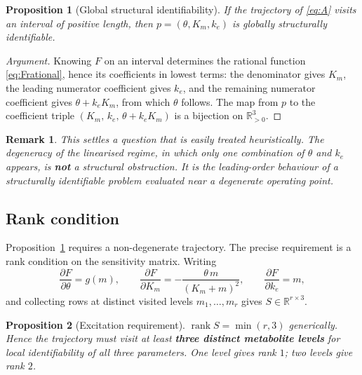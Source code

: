 \documentclass[11pt,a4paper]{article}
\newtheorem{proposition}{Proposition}
\newtheorem{remark}{Remark}
\newcommand{\R}{\mathbb{R}}
\begin{document}
\begin{proposition}[Global structural identifiability]
\label{prop:global}
If the trajectory of \eqref{eq:A} visits an interval of positive length, then
$p = (\theta, K_m, k_e)$ is globally structurally identifiable.
\end{proposition}

\begin{proof}[Argument]
Knowing $F$ on an interval determines the rational function \eqref{eq:Frational}, hence its
coefficients in lowest terms: the denominator gives $K_m$, the leading numerator
coefficient gives $k_e$, and the remaining numerator coefficient gives $\theta + k_e K_m$,
from which $\theta$ follows. The map from $p$ to the coefficient triple
$(K_m,\, k_e,\, \theta + k_e K_m)$ is a bijection on $\R_{>0}^3$.
\end{proof}

\begin{remark}
This settles a question that is easily treated heuristically. The degeneracy of the
linearised regime, in which only one combination of $\theta$ and $k_e$ appears, is
\textbf{not} a structural obstruction. It is the leading-order behaviour of a
structurally identifiable problem evaluated near a degenerate operating point.
\end{remark}

\subsection{Rank condition}

Proposition~\ref{prop:global} requires a non-degenerate trajectory. The precise
requirement is a rank condition on the sensitivity matrix. Writing
\begin{equation}
\frac{\partial F}{\partial \theta} = g(m), \qquad
\frac{\partial F}{\partial K_m} = -\frac{\theta\, m}{(K_m + m)^2}, \qquad
\frac{\partial F}{\partial k_e} = m ,
\label{eq:sens}
\end{equation}
and collecting rows at distinct visited levels $m_1, \dots, m_r$ gives
$S \in \R^{r \times 3}$.

\begin{proposition}[Excitation requirement]
\label{prop:rank}
$\operatorname{rank} S = \min(r, 3)$ generically. Hence the trajectory must visit at least
\textbf{three distinct metabolite levels} for local identifiability of all three
parameters. One level gives rank $1$; two levels give rank $2$.
\end{proposition}
\end{document}
